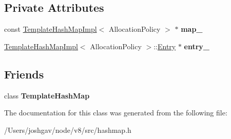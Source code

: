 \subsection*{Private Attributes}
\begin{DoxyCompactItemize}
\item 
const \hyperlink{classv8_1_1internal_1_1_template_hash_map_impl}{Template\+Hash\+Map\+Impl}$<$ Allocation\+Policy $>$ $\ast$ {\bfseries map\+\_\+}\hypertarget{classv8_1_1internal_1_1_template_hash_map_1_1_iterator_a459a985bc2627adb900a7eb493f17aff}{}\label{classv8_1_1internal_1_1_template_hash_map_1_1_iterator_a459a985bc2627adb900a7eb493f17aff}

\item 
\hyperlink{classv8_1_1internal_1_1_template_hash_map_impl}{Template\+Hash\+Map\+Impl}$<$ Allocation\+Policy $>$\+::\hyperlink{structv8_1_1internal_1_1_template_hash_map_impl_1_1_entry}{Entry} $\ast$ {\bfseries entry\+\_\+}\hypertarget{classv8_1_1internal_1_1_template_hash_map_1_1_iterator_a8c3847137dbb50ab19a4fd4ccabe0627}{}\label{classv8_1_1internal_1_1_template_hash_map_1_1_iterator_a8c3847137dbb50ab19a4fd4ccabe0627}

\end{DoxyCompactItemize}
\subsection*{Friends}
\begin{DoxyCompactItemize}
\item 
class {\bfseries Template\+Hash\+Map}\hypertarget{classv8_1_1internal_1_1_template_hash_map_1_1_iterator_a832edaa667b9d84ea7de776a289ff79e}{}\label{classv8_1_1internal_1_1_template_hash_map_1_1_iterator_a832edaa667b9d84ea7de776a289ff79e}

\end{DoxyCompactItemize}


The documentation for this class was generated from the following file\+:\begin{DoxyCompactItemize}
\item 
/\+Users/joshgav/node/v8/src/hashmap.\+h\end{DoxyCompactItemize}
